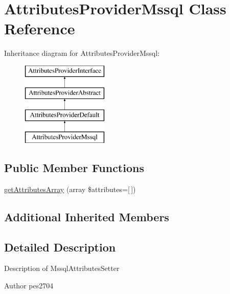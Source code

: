\hypertarget{class_pes_1_1_database_1_1_handler_1_1_attributes_provider_1_1_attributes_provider_mssql}{}\section{Attributes\+Provider\+Mssql Class Reference}
\label{class_pes_1_1_database_1_1_handler_1_1_attributes_provider_1_1_attributes_provider_mssql}
Inheritance diagram for Attributes\+Provider\+Mssql\+:\begin{figure}[H]
\begin{center}
\leavevmode
\includegraphics[height=4.000000cm]{class_pes_1_1_database_1_1_handler_1_1_attributes_provider_1_1_attributes_provider_mssql}
\end{center}
\end{figure}
\subsection*{Public Member Functions}
\begin{DoxyCompactItemize}
\item 
\mbox{\hyperlink{class_pes_1_1_database_1_1_handler_1_1_attributes_provider_1_1_attributes_provider_mssql_a78e4a9edf711d48cd3ec22eaadf560ea}{get\+Attributes\+Array}} (array \$attributes=\mbox{[}$\,$\mbox{]})
\end{DoxyCompactItemize}
\subsection*{Additional Inherited Members}


\subsection{Detailed Description}
Description of Mssql\+Attributes\+Setter

\begin{DoxyAuthor}{Author}
pes2704 
\end{DoxyAuthor}


